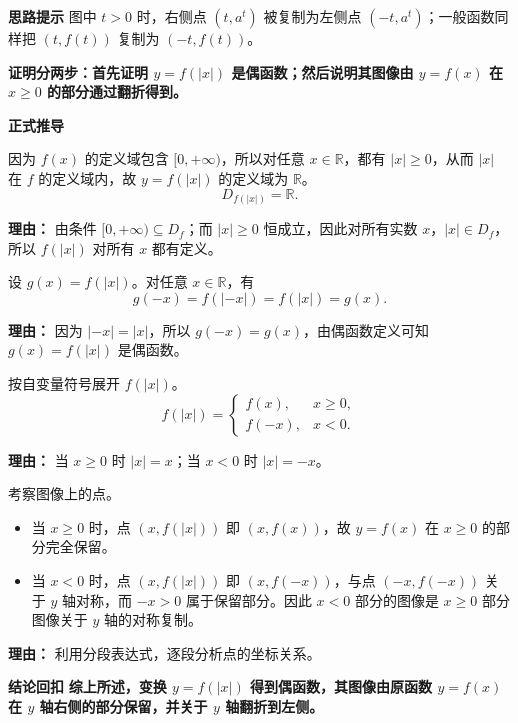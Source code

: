 \begin{proofbox}

	\textbf{\textcolor{CProof}{思路提示}}
	图中 $t>0$ 时，右侧点 $(t,a^t)$ 被复制为左侧点 $(-t,a^t)$；一般函数同样把 $(t,f(t))$ 复制为 $(-t,f(t))$。

\textbf{证明分两步：首先证明 $y=f(|x|)$ 是偶函数；然后说明其图像由 $y=f(x)$ 在 $x\ge 0$ 的部分通过翻折得到。}

	\medskip
	\textbf{\textcolor{CProof}{正式推导}}
	\begin{description}[style=nextline, leftmargin=2.8em, labelsep=0.5em, itemsep=0.55em]
		\item[\textbf{步骤一（定义域对称性）：}]
			因为 $f(x)$ 的定义域包含 $[0,+\infty)$，所以对任意 $x\in\mathbb{R}$，都有 $|x|\ge 0$，从而 $|x|$ 在 $f$ 的定义域内，故 $y=f(|x|)$ 的定义域为 $\mathbb{R}$。
			\[
				D_{f(|x|)}=\mathbb{R}.
			\]
			\par\textbf{理由：} 由条件 $[0,+\infty)\subseteq D_f$；而 $|x|\ge 0$ 恒成立，因此对所有实数 $x$，$|x|\in D_f$，所以 $f(|x|)$ 对所有 $x$ 都有定义。

		\item[\textbf{步骤二（偶函数验证）：}]
			设 $g(x)=f(|x|)$。对任意 $x\in\mathbb{R}$，有
			\[
				g(-x)=f(|-x|)=f(|x|)=g(x).
			\]
			\par\textbf{理由：} 因为 $|-x|=|x|$，所以 $g(-x)=g(x)$，由偶函数定义可知 $g(x)=f(|x|)$ 是偶函数。

		\item[\textbf{步骤三（分段表达式）：}]
			按自变量符号展开 $f(|x|)$。
			\[
				f(|x|)=
				\begin{cases}
					f(x), & x\ge 0,\\[2pt]
					f(-x), & x<0.
				\end{cases}
			\]
			\par\textbf{理由：} 当 $x\ge 0$ 时 $|x|=x$；当 $x<0$ 时 $|x|=-x$。

		\item[\textbf{步骤四（图像对应关系）：}]
			考察图像上的点。
			\begin{itemize}[leftmargin=*]
				\item 当 $x\ge 0$ 时，点 $(x,f(|x|))$ 即 $(x,f(x))$，故 $y=f(x)$ 在 $x\ge 0$ 的部分完全保留。
				\item 当 $x<0$ 时，点 $(x,f(|x|))$ 即 $(x,f(-x))$，与点 $(-x,f(-x))$ 关于 $y$ 轴对称，而 $-x>0$ 属于保留部分。因此 $x<0$ 部分的图像是 $x\ge 0$ 部分图像关于 $y$ 轴的对称复制。
			\end{itemize}
			\par\textbf{理由：} 利用分段表达式，逐段分析点的坐标关系。
	\end{description}

	\medskip
	\textbf{\textcolor{CProof}{结论回扣}}
	\textbf{综上所述，变换 $y=f(|x|)$ 得到偶函数，其图像由原函数 $y=f(x)$ 在 $y$ 轴右侧的部分保留，并关于 $y$ 轴翻折到左侧。}
\end{proofbox}
